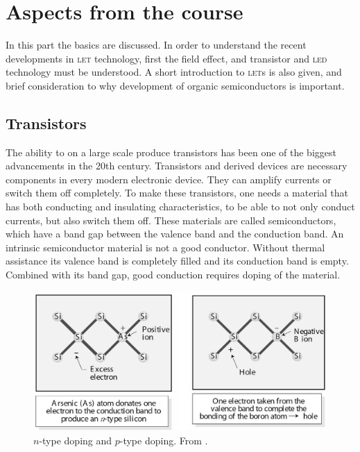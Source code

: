 \section{Aspects from the course}
% 
In this part the basics are discussed. In order to understand the recent developments in \textsc{let} technology, first the field effect, and transistor and \textsc{led} technology must be understood. A short introduction to \textsc{let}s is also given, and brief consideration to why development of organic semiconductors is important.
 
\subsection{Transistors}

The ability to on a large scale produce transistors has been one of the biggest advancements in the 20th century. Transistors and derived devices are necessary components in every modern electronic device. They can amplify currents or switch them off completely. To make these transistors, one needs a material that has both conducting and insulating characteristics, to be able to not only conduct currents, but also switch them off. These materials are called semiconductors, which have a band gap between the valence band and the conduction band. An intrinsic semiconductor material is not a good conductor. Without thermal assistance its valence band is completely filled and its conduction band is empty. Combined with its band gap, good conduction requires doping of the material.

\begin{figure}[!ht]
 \begin{center}
  \includegraphics[width=1\textwidth]{doping}
  \caption{$n$-type doping and $p$-type doping. From \citet{vanweesbook}.}
  \label{fig:doping}
 \end{center}
\end{figure}

